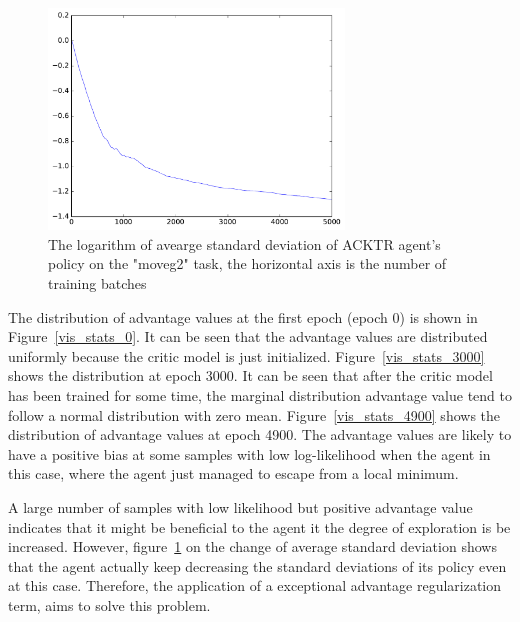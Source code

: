 \begin{figure}[!htbp]
	\includegraphics[width=0.7\textwidth]{images/rec_stat_moveg2_std.pdf}
	\centering
	\caption{The logarithm of avearge standard deviation of ACKTR agent's policy on the "moveg2" task, the horizontal axis is the number of training batches}\label{rec_stat_moveg2_std}
\end{figure}
The distribution of advantage values at the first epoch (epoch 0) is shown in Figure~\ref{vis_stats_0}. It can be seen that the advantage values are distributed uniformly because the critic model is just initialized. Figure~\ref{vis_stats_3000} shows the distribution at epoch 3000. It can be seen that after the critic model has been trained for some time, the marginal distribution advantage value tend to follow a normal distribution with zero mean.  Figure~\ref{vis_stats_4900} shows the distribution of advantage values at epoch 4900. The advantage values are likely to have a positive bias at some samples with low log-likelihood  when the agent in this case, where the agent just managed to escape from a local minimum.  

A large number of samples with low likelihood but positive advantage value indicates that it might be beneficial to the agent it the degree of exploration is be increased. However, figure~\ref{rec_stat_moveg2_std} on the change of average standard deviation shows that the agent actually keep decreasing the standard deviations of its policy even at this case. Therefore, the application of a exceptional advantage regularization term, aims to solve this problem.


